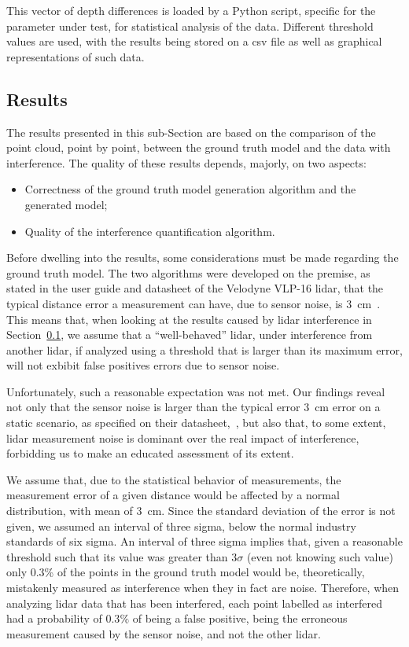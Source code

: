 This vector of depth differences is loaded by a Python script, specific for the parameter under test, for statistical analysis of the data. Different threshold values are used, with the results being stored on a \ac{csv} file as well as graphical representations of such data. 

\subsection{Results}
\label{subsec:lidar-interference:point-to-point-analysis-results}
The results presented in this sub-Section are based on the comparison of the point cloud, point by point, between the ground truth model and the data with interference. The quality of these results depends, majorly, on two aspects:

\begin{itemize}
\item Correctness of the ground truth model generation algorithm and the generated model;
\item Quality of the interference quantification algorithm.
\end{itemize}

Before dwelling into the results, some considerations must be made regarding the ground truth model. The two algorithms were developed on the premise, as stated in the user guide and datasheet of the Velodyne VLP-16 \ac{lidar}, that the typical distance error a measurement can have, due to sensor noise, is \SI{3}{\centi\meter}~\cite{VLP16}. This means that, when looking at the results caused by \ac{lidar} interference in Section~\ref{subsec:lidar-interference:point-to-point-analysis-results}, we assume that a ``well-behaved'' \ac{lidar}, under interference from another \ac{lidar}, if analyzed using a threshold that is larger than its maximum error, will not exbibit false positives errors due to sensor noise.

Unfortunately, such a reasonable expectation was not met. Our findings reveal not only that the sensor noise is larger than the typical error \SI{3}{\centi\meter} error on a static scenario, as specified on their datasheet,~\cite{VLP16}, but also that, to some extent, \ac{lidar} measurement noise is dominant over the real impact of interference, forbidding us to make an educated assessment of its extent.

We assume that, due to the statistical behavior of measurements, the measurement error of a given distance would be affected by a normal distribution, with mean of \SI{3}{\centi\meter}. Since the standard deviation of the error is not given, we assumed an interval of three sigma, below the normal industry standards of six sigma. An interval of three sigma implies that, given a reasonable threshold such that its value was greater than $3\sigma$ (even not knowing such value) only 0.3\% of the points in the ground truth model would be, theoretically, mistakenly measured as interference when they in fact are noise. Therefore, when analyzing \ac{lidar} data that has been interfered, each point labelled as interfered had a probability of $0.3\%$ of being a false positive, being the erroneous measurement caused by the sensor noise, and not the other \ac{lidar}.

